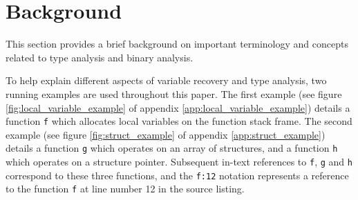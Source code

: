 
\section{Background}

This section provides a brief background on important terminology and concepts related to type analysis and binary analysis.

To help explain different aspects of variable recovery and type analysis, two running examples are used throughout this paper. The first example (see figure \ref{fig:local_variable_example} of appendix \ref{app:local_variable_example}) details a function \texttt{f} which allocates local variables on the function stack frame. The second example (see figure \ref{fig:struct_example} of appendix \ref{app:struct_example}) details a function \texttt{g} which operates on an array of structures, and a function \texttt{h} which operates on a structure pointer. Subsequent in-text references to \texttt{f}, \texttt{g} and \texttt{h} correspond to these three functions, and the \texttt{f:12} notation represents a reference to the function \texttt{f} at line number 12 in the source listing.





%
%
